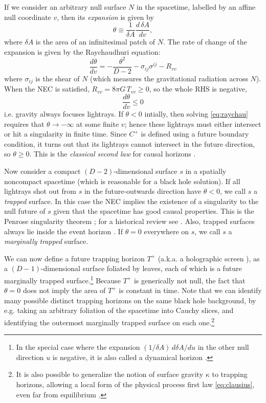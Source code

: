 \documentclass[12pt]{article}
\def\be{\begin{equation}}
\def\ee{\end{equation}}
\begin{document}
If we consider an arbitrary null surface $N$ in the spacetime, labelled by an affine null coordinate $v$, then its \emph{expansion} is given by
\be
\theta \equiv \frac{1}{\delta A} \frac{d\,\delta A}{dv},
\ee  
where $\delta A$ is the area of an infinitesimal patch of $N$. The rate of change of the expansion is given by the Raychaudhuri equation:
\be \label{eq:raychau}
\frac{d \theta}{dv} = - \frac{\theta^2}{D-2} - \sigma_{ij} \sigma^{ij} - R_{vv}
\ee
where $\sigma_{ij}$ is the shear of $N$ (which measures the gravitational radiation across $N$). When the NEC is satisfied, $R_{vv} = 8 \pi G\,T_{vv} \ge 0$, so the whole RHS is negative, 
\be\label{Cfocus}
\frac{d \theta}{dv} \le 0
\ee
i.e. gravity always focuses lightrays. If $\theta < 0$ intially, then solving \eqref{eq:raychau} requires that $\theta \to - \infty$ at some finite $v$; hence these lightrays must either intersect or hit a singularity in finite time.  Since $C^+$ is defined using a future boundary condition, it turns out that its lightrays cannot intersect in the future direction, so $\theta \ge 0$. This is the \emph{classical second law} for causal horizons \cite{hawking1971gravitational}.

Now consider a compact $(D-2)$-dimensional surface $s$ in a spatially noncompact spacetime (which is reasonable for a black hole solution). If all lightrays shot out from $s$ in the future-outwards direction have $\theta < 0$, we call $s$ a \emph{trapped} surface. In this case the NEC implies the existence of a singularity to the null future of $s$ given that the spacetime has good causal properties. This is the Penrose singularity theorem \cite{penrose1965gravitational}; for a historical review see \cite{senovilla20151965}. Also, trapped surfaces always lie inside the event horizon \cite{hawking1973large,wald2010general}. If $\theta=0$ everywhere on $s$, we call $s$ a \emph{marginally trapped} surface.

We can now define a future trapping horizon $T^+$ \cite{hayward1994general} (a.k.a. a holographic screen \cite{bousso1999holography}), as a $(D-1)$-dimensional surface foliated by leaves, each of which is a future marginally trapped surface.\footnote{In the special case where the expansion $(1/\delta\! A)\, d\delta\! A/du$ in the other null direction $u$ is negative, it is also called a dynamical horizon \cite{ashtekar2002dynamical,ashtekar2003dynamical}.} Because $T^+$ is  generically not null, the fact that $\theta = 0$ does not imply the area of $T^+$ is constant in time.  Note that we can identify many possible distinct trapping horizons on the same black hole background, by e.g. taking an arbitrary foliation of the spacetime into Cauchy slices, and identifying the outermost marginally trapped surface on each one.\footnote{It is also possible to generalize the notion of surface gravity $\kappa$ to trapping horizons, allowing a local form of the physical process first law \eqref{eq:clausius}, even far from equilibrium \cite{hayward1994general,ashtekar2002dynamical}.}
\end{document}
